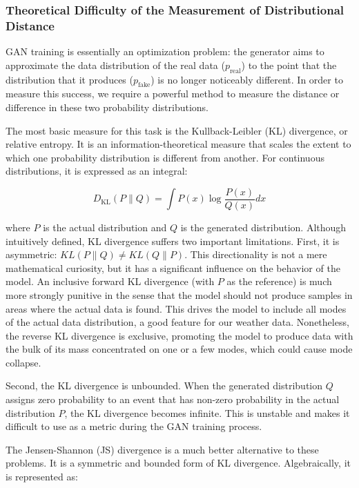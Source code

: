 \documentclass[12pt, draftclsnofoot, onecolumn]{IEEEtran}
\begin{document}
\subsubsection{Theoretical Difficulty of the Measurement of Distributional Distance}
GAN training is essentially an optimization problem: the generator aims to approximate the data distribution of the real data ($p_{\text{real}}$) to the point that the distribution that it produces ($p_{\text{fake}}$) is no longer noticeably different. In order to measure this success, we require a powerful method to measure the distance or difference in these two probability distributions.

The most basic measure for this task is the Kullback-Leibler (KL) divergence, or relative entropy. It is an information-theoretical measure that scales the extent to which one probability distribution is different from another. For continuous distributions, it is expressed as an integral:

\begin{equation}
D_{\text{KL}}(P \| Q) = \int P(x) \log \frac{P(x)}{Q(x)} dx
\end{equation}

where $P$ is the actual distribution and $Q$ is the generated distribution. Although intuitively defined, KL divergence suffers two important limitations. First, it is asymmetric: $KL(P \| Q) \neq KL(Q \| P)$. This directionality is not a mere mathematical curiosity, but it has a significant influence on the behavior of the model. An inclusive forward KL divergence (with $P$ as the reference) is much more strongly punitive in the sense that the model should not produce samples in areas where the actual data is found. This drives the model to include all modes of the actual data distribution, a good feature for our weather data. Nonetheless, the reverse KL divergence is exclusive, promoting the model to produce data with the bulk of its mass concentrated on one or a few modes, which could cause mode collapse.

Second, the KL divergence is unbounded. When the generated distribution $Q$ assigns zero probability to an event that has non-zero probability in the actual distribution $P$, the KL divergence becomes infinite. This is unstable and makes it difficult to use as a metric during the GAN training process.

The Jensen-Shannon (JS) divergence is a much better alternative to these problems. It is a symmetric and bounded form of KL divergence. Algebraically, it is represented as:
\end{document}
